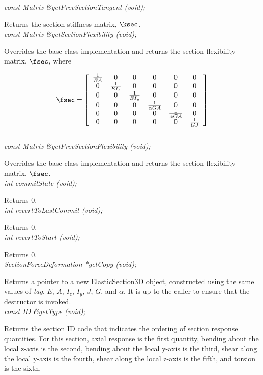 {\em const Matrix \&getPrevSectionTangent (void); } 

Returns the section stiffness matrix, $\ksec$. \\

{\em const Matrix \&getSectionFlexibility (void); } 

Overrides the base class implementation and returns the section
flexibility matrix, $\fsec$, where

\begin{equation}
\fsec = \left[
   \begin{array}{cccccc}
       \frac{1}{EA} & 0 & 0 & 0 & 0 & 0 \\
       0 & \frac{1}{EI_z} & 0 & 0 & 0 & 0 \\
       0 & 0 & \frac{1}{EI_y} & 0 & 0 & 0 \\
       0 & 0 & 0 & \frac{1}{\alpha GA} & 0 & 0 \\ 
       0 & 0 & 0 & 0 & \frac{1}{\alpha GA} & 0 \\
       0 & 0 & 0 & 0 & 0 & \frac{1}{GJ}
   \end{array} 
 \right]
\end{equation} \\

{\em const Matrix \&getPrevSectionFlexibility (void); } 

Overrides the base class implementation and returns the section
flexibility matrix, $\fsec$. \\

{\em int commitState (void); } 

Returns $0$. \\

{\em int revertToLastCommit (void); } 

Returns $0$. \\

{\em int revertToStart (void); } 

Returns $0$. \\

{\em SectionForceDeformation *getCopy (void); } 

Returns a pointer to a new ElasticSection3D object, constructed
using the same values of {\em tag}, $E$, $A$, $I_z$, $I_y$, $J$, $G$, and $\alpha$.
It is up to the caller to ensure that the destructor is invoked. \\

{\em const ID \&getType (void); } 

Returns the section ID code that indicates the ordering of
section response quantities. For this section, axial response is the
first quantity, bending about the local z-axis is the second, bending about
the local y-axis is the third, shear along the local y-axis is the fourth,
shear along the local z-axis is the fifth, and torsion is the sixth. \\

